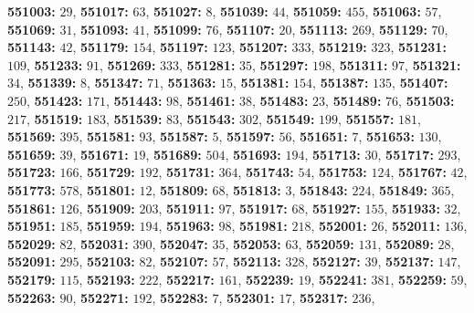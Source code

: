 \textsf{\bfseries 551003:} $29$, \textsf{\bfseries 551017:} $63$, \textsf{\bfseries 551027:} $8$, \textsf{\bfseries 551039:} $44$, \textsf{\bfseries 551059:} $455$, \textsf{\bfseries 551063:} $57$, \textsf{\bfseries 551069:} $31$, \textsf{\bfseries 551093:} $41$, \textsf{\bfseries 551099:} $76$, \textsf{\bfseries 551107:} $20$, \textsf{\bfseries 551113:} $269$, \textsf{\bfseries 551129:} $70$, \textsf{\bfseries 551143:} $42$, \textsf{\bfseries 551179:} $154$, \textsf{\bfseries 551197:} $123$, \textsf{\bfseries 551207:} $333$, \textsf{\bfseries 551219:} $323$, \textsf{\bfseries 551231:} $109$, \textsf{\bfseries 551233:} $91$, \textsf{\bfseries 551269:} $333$, \textsf{\bfseries 551281:} $35$, \textsf{\bfseries 551297:} $198$, \textsf{\bfseries 551311:} $97$, \textsf{\bfseries 551321:} $34$, \textsf{\bfseries 551339:} $8$, \textsf{\bfseries 551347:} $71$, \textsf{\bfseries 551363:} $15$, \textsf{\bfseries 551381:} $154$, \textsf{\bfseries 551387:} $135$, \textsf{\bfseries 551407:} $250$, \textsf{\bfseries 551423:} $171$, \textsf{\bfseries 551443:} $98$, \textsf{\bfseries 551461:} $38$, \textsf{\bfseries 551483:} $23$, \textsf{\bfseries 551489:} $76$, \textsf{\bfseries 551503:} $217$, \textsf{\bfseries 551519:} $183$, \textsf{\bfseries 551539:} $83$, \textsf{\bfseries 551543:} $302$, \textsf{\bfseries 551549:} $199$, \textsf{\bfseries 551557:} $181$, \textsf{\bfseries 551569:} $395$, \textsf{\bfseries 551581:} $93$, \textsf{\bfseries 551587:} $5$, \textsf{\bfseries 551597:} $56$, \textsf{\bfseries 551651:} $7$, \textsf{\bfseries 551653:} $130$, \textsf{\bfseries 551659:} $39$, \textsf{\bfseries 551671:} $19$, \textsf{\bfseries 551689:} $504$, \textsf{\bfseries 551693:} $194$, \textsf{\bfseries 551713:} $30$, \textsf{\bfseries 551717:} $293$, \textsf{\bfseries 551723:} $166$, \textsf{\bfseries 551729:} $192$, \textsf{\bfseries 551731:} $364$, \textsf{\bfseries 551743:} $54$, \textsf{\bfseries 551753:} $124$, \textsf{\bfseries 551767:} $42$, \textsf{\bfseries 551773:} $578$, \textsf{\bfseries 551801:} $12$, \textsf{\bfseries 551809:} $68$, \textsf{\bfseries 551813:} $3$, \textsf{\bfseries 551843:} $224$, \textsf{\bfseries 551849:} $365$, \textsf{\bfseries 551861:} $126$, \textsf{\bfseries 551909:} $203$, \textsf{\bfseries 551911:} $97$, \textsf{\bfseries 551917:} $68$, \textsf{\bfseries 551927:} $155$, \textsf{\bfseries 551933:} $32$, \textsf{\bfseries 551951:} $185$, \textsf{\bfseries 551959:} $194$, \textsf{\bfseries 551963:} $98$, \textsf{\bfseries 551981:} $218$, \textsf{\bfseries 552001:} $26$, \textsf{\bfseries 552011:} $136$, \textsf{\bfseries 552029:} $82$, \textsf{\bfseries 552031:} $390$, \textsf{\bfseries 552047:} $35$, \textsf{\bfseries 552053:} $63$, \textsf{\bfseries 552059:} $131$, \textsf{\bfseries 552089:} $28$, \textsf{\bfseries 552091:} $295$, \textsf{\bfseries 552103:} $82$, \textsf{\bfseries 552107:} $57$, \textsf{\bfseries 552113:} $328$, \textsf{\bfseries 552127:} $39$, \textsf{\bfseries 552137:} $147$, \textsf{\bfseries 552179:} $115$, \textsf{\bfseries 552193:} $222$, \textsf{\bfseries 552217:} $161$, \textsf{\bfseries 552239:} $19$, \textsf{\bfseries 552241:} $381$, \textsf{\bfseries 552259:} $59$, \textsf{\bfseries 552263:} $90$, \textsf{\bfseries 552271:} $192$, \textsf{\bfseries 552283:} $7$, \textsf{\bfseries 552301:} $17$, \textsf{\bfseries 552317:} $236$, 
